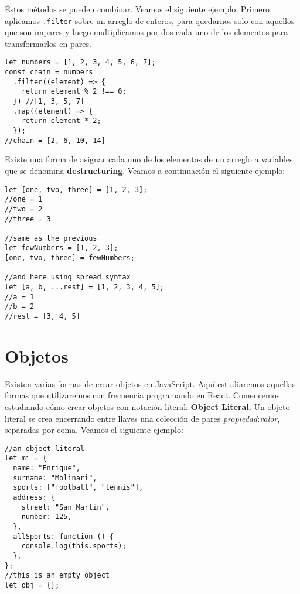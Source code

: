 \documentclass[a4paper, oneside, titlepage, 12pt]{paper}
\begin{document}
Éstos métodos se pueden combinar. Veamos el siguiente ejemplo. Primero aplicamos \texttt{.filter} sobre un arreglo de enteros, para quedarnos solo con aquellos que son impares y luego multiplicamos por dos cada uno de los elementos para transformarlos en pares. 

\begin{verbatim}
let numbers = [1, 2, 3, 4, 5, 6, 7];
const chain = numbers
  .filter((element) => {
    return element % 2 !== 0;
  }) //[1, 3, 5, 7]
  .map((element) => {
    return element * 2;
  });
//chain = [2, 6, 10, 14]
\end{verbatim}

Existe una forma de asignar cada uno de los elementos de un arreglo a variables que se denomina \textbf{destructuring}. Veamos a continuación el siguiente ejemplo:

\begin{verbatim}
let [one, two, three] = [1, 2, 3];
//one = 1
//two = 2
//three = 3

//same as the previous
let fewNumbers = [1, 2, 3];
[one, two, three] = fewNumbers;

//and here using spread syntax
let [a, b, ...rest] = [1, 2, 3, 4, 5];
//a = 1
//b = 2
//rest = [3, 4, 5]
\end{verbatim}

\section{Objetos}\label{jsobjects}

Existen varias formas de crear objetos en JavaScript. Aquí estudiaremos aquellas formas que utilizaremos con frecuencia programando en React. Comencemos estudiando cómo crear objetos con notación literal: \textbf{Object Literal}. Un objeto literal se crea encerrando entre llaves una colección de pares \textit{propiedad}:\textit{valor}, separadas por coma. Veamos el siguiente ejemplo: 

\begin{verbatim}
//an object literal
let mi = {
  name: "Enrique",
  surname: "Molinari",
  sports: ["football", "tennis"],
  address: {
    street: "San Martin",
    number: 125,
  },
  allSports: function () {
    console.log(this.sports);
  },
};
//this is an empty object
let obj = {};
\end{verbatim}
\end{document}
